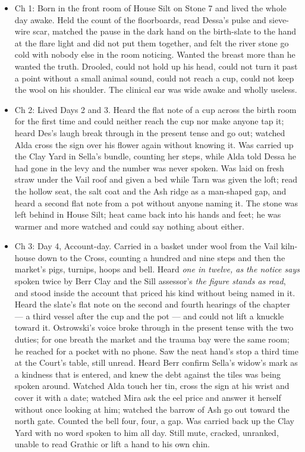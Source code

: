 \documentclass{design/chronicle}
\begin{document}
{\begin{itemize}[leftmargin=1.4em,itemsep=1pt,topsep=3pt,parsep=0pt]
\item Ch 1: Born in the front room of House Silt on Stone 7 and lived the whole day awake. Held the count of the floorboards, read Dessa’s pulse and sieve-wire scar, matched the pause in the dark hand on the birth-slate to the hand at the flare light and did not put them together, and felt the river stone go cold with nobody else in the room noticing. Wanted the breast more than he wanted the truth. Drooled, could not hold up his head, could not turn it past a point without a small animal sound, could not reach a cup, could not keep the wool on his shoulder. The clinical ear was wide awake and wholly useless.

\item Ch 2: Lived Days 2 and 3. Heard the flat note of a cup across the birth room for the first time and could neither reach the cup nor make anyone tap it; heard Des’s laugh break through in the present tense and go out; watched Alda cross the sign over his flower again without knowing it. Was carried up the Clay Yard in Sella’s bundle, counting her steps, while Alda told Dessa he had gone in the levy and the number was never spoken. Was laid on fresh straw under the Vail roof and given a bed while Tarn was given the loft; read the hollow seat, the salt coat and the Ash ridge as a man-shaped gap, and heard a second flat note from a pot without anyone naming it. The stone was left behind in House Silt; heat came back into his hands and feet; he was warmer and more watched and could say nothing about either.

\item Ch 3: Day 4, Account-day. Carried in a basket under wool from the Vail kiln-house down to the Cross, counting a hundred and nine steps and then the market’s pigs, turnips, hoops and bell. Heard \emph{one in twelve, as the notice says} spoken twice by Berr Clay and the Sill assessor’s \emph{the figure stands as read}, and stood inside the account that priced his kind without being named in it. Heard the slate’s flat note on the second and fourth hearings of the chapter --- a third vessel after the cup and the pot --- and could not lift a knuckle toward it. Ostrowski’s voice broke through in the present tense with the two duties; for one breath the market and the trauma bay were the same room; he reached for a pocket with no phone. Saw the neat hand’s stop a third time at the Court’s table, still unread. Heard Berr confirm Sella’s widow’s mark as a kindness that is entered, and knew the debt against the tiles was being spoken around. Watched Alda touch her tin, cross the sign at his wrist and cover it with a date; watched Mira ask the eel price and answer it herself without once looking at him; watched the barrow of Ash go out toward the north gate. Counted the bell four, four, a gap. Was carried back up the Clay Yard with no word spoken to him all day. Still mute, cracked, unranked, unable to read Grathic or lift a hand to his own chin.


\end{itemize}}
\end{document}
